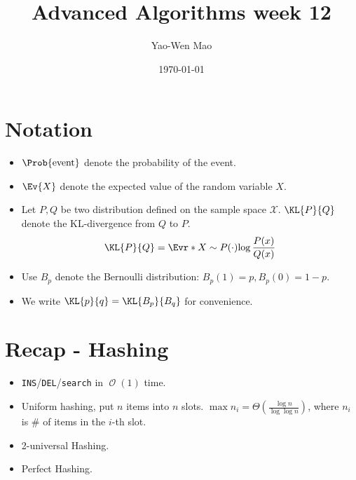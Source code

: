 \documentclass[a4paper]{article}
\title{Advanced Algorithms week 12}
\author{Yao-Wen Mao}
\date{\today}
\newcommand*{\Xc}{\mathcal{X}}
\DeclareMathOperator{\Ord}{\mathcal{O}}
\theoremstyle{mystyle}
\begin{document}
\maketitle
\section*{Notation}
\begin{itemize}
  \item $\Prob{ \text{event} }$ denote the probability of the event.
  \item $\Ev{X}$ denote the expected value of the random variable $X$.
  \item Let $P, Q$ be two distribution defined on the sample space $\Xc$.
    $\KL{P}{Q}$ denote the KL-divergence from $Q$ to $P$.
    \[
      \KL{P}{Q} = \Evr*{X \sim P(\cdot)}{\log \frac{P(x)}{Q(x)}}
    \]
  \item Use $B_p$ denote the Bernoulli distribution:
    $ B_p(1) = p, B_p(0) = 1 - p. $
  \item We write $\KL{p}{q} = \KL{B_p}{B_q}$ for convenience.
\end{itemize}

\setcounter{section}{-1}
\section{Recap - Hashing}
\begin{itemize}
  \item {\tt INS}/{\tt DEL}/{\tt search} in $\Ord(1)$ time.
  \item Uniform hashing, put $n$ items into $n$ slots.
    $\max n_i = \Theta\left( \frac{\log n}{\log \log n} \right)$,
    where $n_i$ is \# of items in the $i$-th slot.
  \item 2-universal Hashing.
  \item Perfect Hashing.
\end{itemize}
\end{document}
